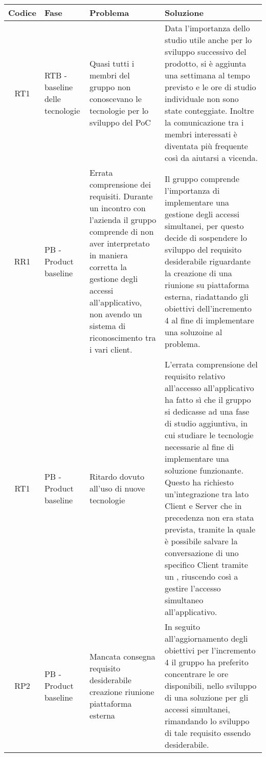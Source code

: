 \begin{center}
\renewcommand{\arraystretch}{1.8} %
\begin{longtable}{ |c|p{8em}|p{12em}|p{12em}| }
	\hline
	\textbf{Codice} & \textbf{Fase} & \textbf{Problema} &  \textbf{Soluzione} \\
	\hline
    RT1 & RTB - baseline delle tecnologie & Quasi tutti i membri del gruppo non conoscevano le tecnologie per lo sviluppo del PoC & Data l'importanza dello studio utile anche per lo sviluppo successivo del prodotto, si è aggiunta una settimana al tempo previsto e le ore di studio individuale non sono state conteggiate. \newline Inoltre la comunicazione tra i membri interessati è diventata più frequente così da aiutarsi a vicenda.\\
    \hline
	RR1 & PB - Product baseline & Errata comprensione dei requisiti. Durante un incontro con l'azienda il gruppo comprende di non aver interpretato in maniera corretta la gestione degli accessi all'applicativo, non avendo un sistema di riconoscimento tra i vari client. & Il gruppo comprende l'importanza di implementare una gestione degli accessi simultanei, per questo decide di sospendere lo sviluppo del requisito desiderabile riguardante la creazione di una riunione su piattaforma esterna, riadattando gli obiettivi dell'incremento 4 al fine di implementare una soluzoine al problema.\\
	\hline
	RT1 & PB - Product baseline & Ritardo dovuto all'uso di nuove tecnologie & L'errata comprensione del requisito relativo all'accesso all'applicativo ha fatto sì che il gruppo si dedicasse ad una fase di studio aggiuntiva, in cui studiare le tecnologie necessarie al fine di implementare una soluzione funzionante. Questo ha richiesto un'integrazione tra lato Client e Server che in precedenza non era stata prevista, tramite la quale è possibile salvare la conversazione di uno specifico Client tramite un \glossario{UUID}, riuscendo così a gestire l'accesso simultaneo all'applicativo.\\
	\hline
	RP2 & PB - Product baseline & Mancata consegna requisito desiderabile creazione riunione piattaforma esterna & In seguito all'aggiornamento degli obiettivi per l'incremento 4 il gruppo ha preferito concentrare le ore disponibili, nello sviluppo di una soluzione per gli accessi simultanei, rimandando lo sviluppo di tale requisito essendo desiderabile. \\
	\hline
	
\end{longtable}
\end{center}
\newpage